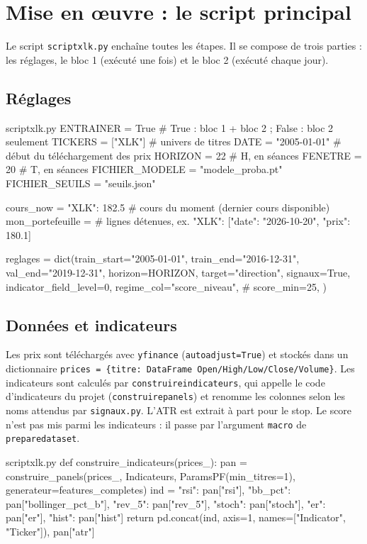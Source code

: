 \documentclass[11pt,a4paper]{article}
\renewcommand{\_}{\usorig\allowbreak}   %
\newcommand{\f}[1]{\texttt{#1}}        %
\begin{document}
\section{Mise en œuvre : le script principal}\label{sec:pipeline}
Le script \f{script\_xlk.py} enchaîne toutes les étapes. Il se compose de trois parties :
les réglages, le bloc 1 (exécuté une fois) et le bloc 2 (exécuté chaque jour).

\subsection{Réglages}
\begin{code}{script\_xlk.py}
ENTRAINER = True            # True : bloc 1 + bloc 2 ; False : bloc 2 seulement
TICKERS   = ["XLK"]         # univers de titres
DATE      = "2005-01-01"    # début du téléchargement des prix
HORIZON   = 22              # H, en séances
FENETRE   = 20              # T, en séances
FICHIER_MODELE = "modele_proba.pt"
FICHIER_SEUILS = "seuils.json"

cours_now = {"XLK": 182.5}  # cours du moment (dernier cours disponible)
mon_portefeuille = {}       # lignes détenues, ex. {"XLK": [{"date": "2026-10-20", "prix": 180.1}]}

reglages = dict(train_start="2005-01-01", train_end="2016-12-31", val_end="2019-12-31",
                horizon=HORIZON, target="direction", signaux=True,
                indicator_field_level=0,
                regime_col="score_niveau",
                # score_min=25,
                )
\end{code}

\subsection{Données et indicateurs}
Les prix sont téléchargés avec \f{yfinance} (\f{auto\_adjust=True}) et stockés dans un
dictionnaire \f{prices = \{titre: DataFrame Open/High/Low/Close/Volume\}}. Les indicateurs
sont calculés par \f{construire\_indicateurs}, qui appelle le code d'indicateurs du projet
(\f{construire\_panels}) et renomme les colonnes selon les noms attendus par
\f{signaux.py}. L'ATR est extrait à part pour le stop. Le score n'est pas mis parmi les
indicateurs : il passe par l'argument \f{macro} de \f{prepare\_dataset}.

\begin{code}[indicateurs]{script\_xlk.py}
def construire_indicateurs(prices_):
    pan = construire_panels(prices_, Indicateurs, ParamsPF(min_titres=1),
                            generateur=features_completes)
    ind = {"rsi": pan["rsi"], "bb_pct": pan["bollinger_pct_b"], "rev_5": pan["rev_5"],
           "stoch": pan["stoch"], "er": pan["er"], "hist": pan["hist"]}
    return pd.concat(ind, axis=1, names=["Indicator", "Ticker"]), pan["atr"]
\end{code}
\end{document}
